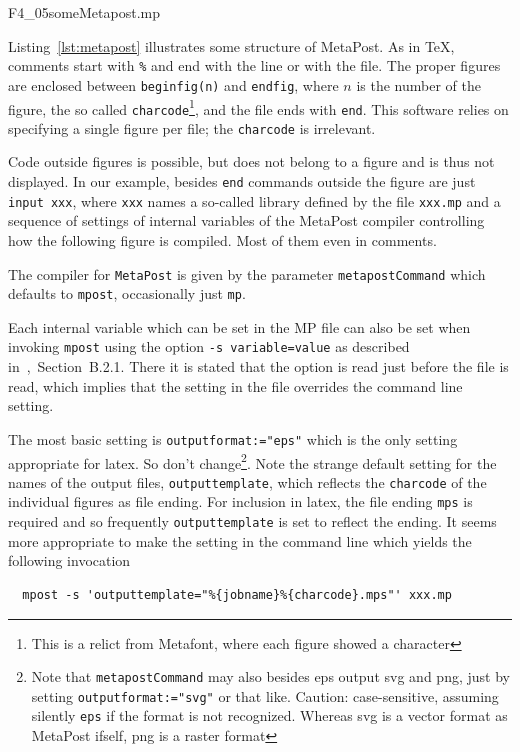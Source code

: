 
{F4_05someMetapost.mp}

Listing~\ref{lst:metapost} illustrates some structure of MetaPost. 
As in \TeX, comments start with \texttt{\%} and end with the line or with the file. 
The proper figures are enclosed between \texttt{beginfig(n)} and \texttt{endfig}, 
where $n$ is the number of the figure, the so called \texttt{charcode}\footnote%
{This is a relict from Metafont, where each figure showed a character}, 
and the file ends with \texttt{end}. 
This software relies on specifying a single figure per file; the \texttt{charcode} is irrelevant. 

Code outside figures is possible, but does not belong to a figure 
and is thus not displayed. 
In our example, besides \texttt{end} commands outside the figure 
are just \texttt{input xxx}, where \texttt{xxx} names a so-called library 
defined by the file \texttt{xxx.mp} 
and a sequence of settings of internal variables 
of the MetaPost compiler 
controlling how the following figure is compiled. 
Most of them even in comments. 

The compiler for \texttt{MetaPost} 
is given by the parameter \texttt{metapostCommand} 
which defaults to \texttt{mpost}, occasionally just \texttt{mp}. 

Each internal variable which can be set in the MP file 
can also be set when invoking \texttt{mpost} 
using the option \texttt{-s \textlangle variable\textrangle=\textlangle value\textrangle} 
as described in~\cite{MPost},~Section~B.2.1. 
There it is stated that the option is read just before the file is read, 
which implies that the setting in the file overrides the command line setting. 

The most basic setting is \texttt{outputformat:="eps"} 
which is the only setting appropriate for latex. 
So don't change\footnote%
{Note that \texttt{metapostCommand} may also besides \gls{eps} 
output \gls{svg} and \gls{png}, 
just by setting \texttt{outputformat:="svg"} or that like. 
Caution: case-sensitive, assuming silently \texttt{eps} if the format is not recognized. 
Whereas \gls{svg} is a vector format as MetaPost ifself, \gls{png} is a raster format}. 
Note the strange default setting for the names of the output files, \texttt{outputtemplate}, 
which reflects the \texttt{charcode} of the individual figures as file ending. 
For inclusion in latex, the file ending \texttt{mps} is required 
and so frequently \texttt{outputtemplate} is set to reflect the ending. 
It seems more appropriate to make the setting in the command line 
which yields the following invocation
%
\begin{verbatim}
  mpost -s 'outputtemplate="%{jobname}%{charcode}.mps"' xxx.mp
\end{verbatim}

